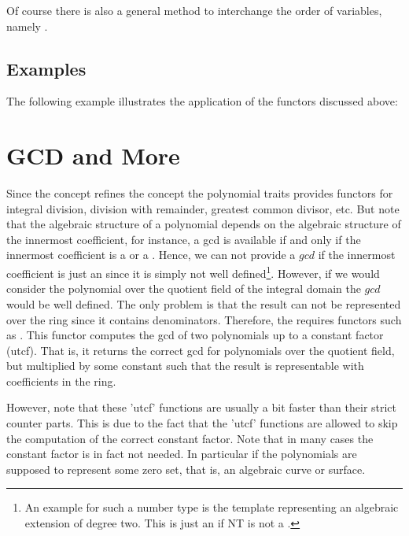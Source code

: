 Of course there is also a general method to interchange the order of 
variables, namely .

\subsection{Examples}
The following example illustrates the application of the functors discussed 
above:


\section{GCD and More}

Since the concept  refines the concept 
 the polynomial traits provides functors for 
integral division, division with remainder, greatest common divisor, etc.
But note that the algebraic structure of a polynomial depends on the algebraic 
structure of the innermost coefficient, for instance, a gcd is available 
if and only if the innermost coefficient is a  or a 
. Hence, we can not provide a $gcd$ if the 
innermost coefficient is just an  since it is simply 
not well defined\footnote{%
An example for such a number type is the template 
 representing an algebraic extension of 
degree two. This is just an  if NT is not a . }.
% 
However, if we would consider the polynomial over the quotient field of the 
integral domain the $gcd$ would be well defined. The only problem is
that the result can not be represented over the ring since it contains 
denominators.   
Therefore, the  requires functors such as 
. 
This functor computes the gcd of two polynomials up to a constant factor (utcf).
That is, it returns the correct gcd for polynomials over the quotient field, 
but multiplied by some constant such that the result is representable with 
coefficients in the ring. 

However, note that these 'utcf' functions are usually a bit faster than their 
strict counter parts. This is due to the fact that the 'utcf' functions are allowed 
to skip the computation of the correct constant factor.
Note that in many cases the constant factor is in fact not needed.
In particular if the polynomials are supposed to represent some zero set, 
that is, an algebraic curve or surface.  

